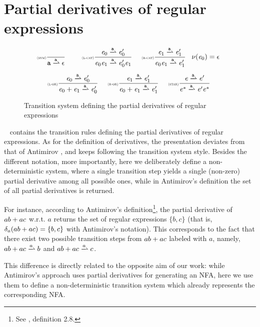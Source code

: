\section{Partial derivatives of regular expressions}\label{sec:parDer}

\begin{figure}
 $$
  \begin{array}{c}
   \Rule{sym}{}{\sym\parDer{\sym}\eps}\quad
   \Rule{l-cat}{\re_0\parDer{\sym}\re'_0}{\re_0\catop\re_1\parDer{\sym}\re'_0\catop\re_1}{}\quad
   \Rule{r-cat}{\re_1\parDer{\sym}\re'_1}{\re_0\catop\re_1\parDer{\sym}\re'_1}{\hasEps{\re_0}=\eps} \\[4ex]
   \Rule{l-or}{\re_0\parDer{\sym}\re'_0}{\re_0\orop\re_1\parDer{\sym}\re'_0}{} \quad
   \Rule{r-or}{\re_1\parDer{\sym}\re'_1}{\re_0\orop\re_1\parDer{\sym}\re'_1}{} \quad
   \Rule{star}{\re\parDer{\sym}\re'}{\starop{\re}\parDer{\sym}\re'\starop{\re}}{}
  \end{array}
 $$
 \caption{Transition system defining the partial derivatives of regular expressions}
 \label{parDer}
\end{figure}

~ contains the transition rules defining the partial derivatives of regular expressions.
As for the definition of derivatives, the presentation deviates from that of Antimirov \cite{Antimirov96}, and keeps following the transition system style. Besides the different notation, more importantly, here we deliberately define a non-deterministic system, where a single transition step yields a single (non-zero) partial derivative among all possible ones, while in Antimirov's definition the set of all partial derivatives is returned.

For instance, according to Antimirov's definition\footnote{See \cite{Antimirov96}, definition 2.8.},
the partial derivative of $ab \mathbin{+} ac$ w.r.t. $a$ returns the set of regular expressions $\{b,c\}$ (that is, $\delta_a(ab \mathbin{+} ac)=\{b,c\}$ with Antimirov's notation). This corresponds to the fact that there exist two possible transition steps from $ab \mathbin{+} ac$ labeled with $a$, namely,
$ab \orop ac\parDer{a}b$ and $ab \orop ac\parDer{a}c$.

This difference is directly related to the opposite aim of our work: while Antimirov's approach uses partial derivatives for generating an NFA, here
we use them to define a non-deterministic transition system which already represents the corresponding NFA.

